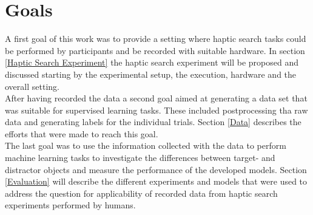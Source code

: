 \section{Goals} \label{Goals}
A first goal of this work was to provide a setting where haptic search tasks could be performed by participants and be recorded with suitable hardware. In section \ref{Haptic Search Experiment} the haptic search experiment will be proposed and discussed starting by the experimental setup, the execution, hardware and the overall setting.\\
After having recorded the data a second goal aimed at generating a data set that was suitable for supervised learning tasks. These included postprocessing tha raw data and generating labels for the individual trials. Section \ref{Data} describes the efforts that were made to reach this goal.\\
The last goal was to use the information collected with the data to perform machine learning tasks to investigate the differences between target- and distractor objects and measure the performance of the developed models. Section \ref{Evaluation} will describe the different experiments and models that were used to address the question for applicability of recorded data from haptic search experiments performed by humans.  
